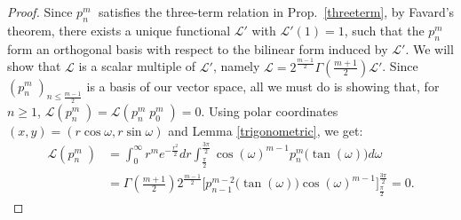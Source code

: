 \documentclass{amsart}
\newcommand{\p}[2]{p_{#1}^{#2}\;\!\!}
\renewcommand{\L}{\mathcal{L}}
\theoremstyle{plain}
\theoremstyle{definition}
\theoremstyle{remark}
\begin{document}
\begin{proof}
Since $\p{n}{m}$ satisfies the three-term relation in Prop.~\ref{threeterm}, by Favard's theorem, there exists a unique functional $\L'$ with $\L'(1)=1$, such that the $\p{n}{m}$ form an orthogonal basis with respect to the bilinear form induced by $\L'$. We will show that $\L$ is a scalar multiple of $\L'$, namely $\L=2^{\frac{m-1}{2}}\Gamma\left(\frac{m+1}{2}\right) \L'$. Since $(\p{n}{m})_{n\leq\frac{m-1}{2}} $ is a basis of our vector space, all we must do is showing that, for $n\geq 1$, $\L(\p{n}{m}) = \L(\p{n}{m}\p{0}{m}) =0$.
Using polar coordinates $(x,y) = (r\cos\omega,r\sin\omega)$ and Lemma \ref{trigonometric}, we get:
\begin{align*}
\L(\p{n}{m}) &= \int_0^\infty r^m e^{-\frac{r^2}{2}}dr \int_{\frac{\pi}{2}}^{\frac{3\pi}{2}} \cos(\omega)^{m-1} p_{n}^{m}\big(\tan(\omega)\big)d\omega\\
&= \Gamma\left(\tfrac{m+1}{2}\right)2^{\frac{m-1}{2}}\Big[p_{n-1}^{m-2}\big(\tan(\omega)\big)\cos(\omega)^{m-1} \Big]_{\frac{\pi}{2}}^{\frac{3\pi}{2}} =0.
\end{align*}
\end{proof}





\end{document}

